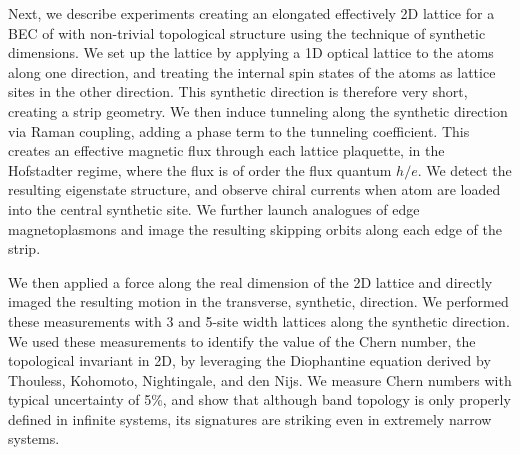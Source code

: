 Next, we describe experiments creating an elongated effectively 2D lattice for a BEC of \Rb{} with non-trivial topological structure using the technique of synthetic dimensions.  We set up the lattice by applying a 1D optical lattice to the atoms along one direction, and treating the internal spin states of the atoms as lattice sites in the other direction. This synthetic direction is therefore very short, creating a strip geometry. We then induce tunneling along the synthetic direction via Raman coupling, adding a phase term to the tunneling coefficient. This creates an effective magnetic flux through each lattice plaquette, in the Hofstadter regime, where the flux is of order the flux quantum $h/e$. We detect the resulting eigenstate structure, and observe chiral currents when atom are loaded into the central synthetic site. We further launch analogues of edge magnetoplasmons and image the resulting skipping orbits along each edge of the strip.

We then applied a force along the real dimension of the 2D lattice and directly imaged the resulting motion in the transverse, synthetic, direction. We performed these measurements with 3 and 5-site width lattices along the synthetic direction. We used these measurements to identify the value of the Chern number, the topological invariant in 2D, by leveraging the Diophantine equation derived by Thouless, Kohomoto, Nightingale, and den Nijs. We measure Chern numbers with typical uncertainty of 5\%, and show that although band topology is only properly defined in infinite systems, its signatures are striking even in extremely narrow systems.
